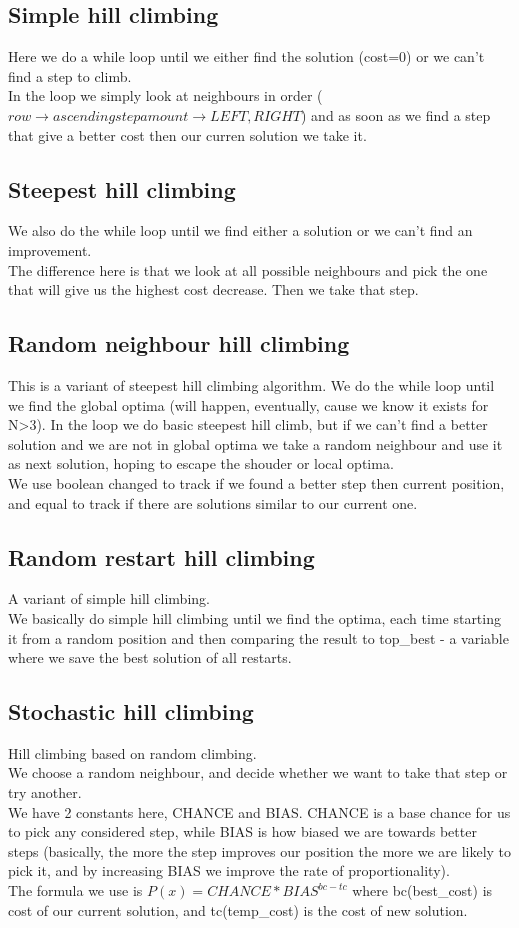 \documentclass[10pt,a4paper]{article}
\begin{document}
		\subsection{Simple hill climbing}
			Here we do a while loop until we either find the solution (cost=0) or we can't find a step to climb. \\
			In the loop we simply look at neighbours in order ($row \rightarrow ascending step amount \rightarrow LEFT,RIGHT$) and as soon as we find a step that give a better cost then our curren solution we take it.
		\subsection{Steepest hill climbing}
			We also do the while loop until we find either a solution or we can't find an improvement. \\
			The difference here is that we look at all possible neighbours and pick the one that will give us the highest cost decrease. Then we take that step.
		\subsection{Random neighbour hill climbing}
			This is a variant of steepest hill climbing algorithm.
			We do the while loop until we find the global optima (will happen, eventually, cause we know it exists for N>3).
			In the loop we do basic steepest hill climb, but if we can't find a better solution and we are not in global optima we take a random neighbour and use it as next solution, hoping to escape the shouder or local optima.\\
			We use boolean changed to track if we found a better step then current position, and equal to track if there are solutions similar to our current one.
		\subsection{Random restart hill climbing}
			A variant of simple hill climbing. \\
			We basically do simple hill climbing until we find the optima, each time starting it from a random position and then comparing the result to top\_best - a variable where we save the best solution of all restarts.\
		\subsection{Stochastic hill climbing}
			Hill climbing based on random climbing. \\
			We choose a random neighbour, and decide whether we want to take that step or try another. \\
			We have 2 constants here, CHANCE and BIAS. CHANCE is a base chance for us to pick any considered step, while BIAS is how biased we are towards better steps (basically, the more the step improves our position the more we are likely to pick it, and by increasing BIAS we improve the rate of proportionality).\\
			The formula we use is $P(x)=CHANCE*BIAS^{bc-tc}$ where bc(best\_cost) is cost of our current solution, and tc(temp\_cost) is the cost of new solution.
\end{document}
